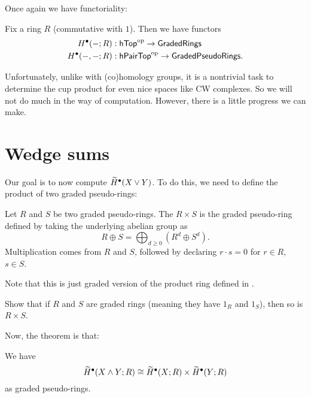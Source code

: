 Once again we have functoriality:
\begin{theorem}
	Fix a ring $R$ (commutative with $1$).
	Then we have functors
	\begin{align*}
		H^\bullet(-; R) &: \mathsf{hTop}^{\mathrm{op}} \to \mathsf{GradedRings} \\
		H^\bullet(-,-; R) &: \mathsf{hPairTop}^{\mathrm{op}} \to \mathsf{GradedPseudoRings}.
	\end{align*}
\end{theorem}

Unfortunately, unlike with (co)homology groups,
it is a nontrivial task to determine the cup product
for even nice spaces like CW complexes.
So we will not do much in the way of computation.
However, there is a little progress we can make.

\section{Wedge sums}
Our goal is to now compute $\widetilde H^\bullet(X \vee Y)$.
To do this, we need to define the product of two graded pseudo-rings:
\begin{definition}
	Let $R$ and $S$ be two graded pseudo-rings.
	The  $R \times S$ is the graded pseudo-ring
	defined by taking the underlying abelian group as 
	\[ R \oplus S = \bigoplus_{d \ge 0} (R^d \oplus S^d). \]
	Multiplication comes from $R$ and $S$, followed by
	declaring $r \cdot s = 0$ for $r \in R$, $s \in S$.
\end{definition}
Note that this is just graded version of the product ring
defined in .
\begin{exercise}
	Show that if $R$ and $S$ are graded rings (meaning they have $1_R$ and $1_S$),
	then so is $R \times S$.
\end{exercise}

Now, the theorem is that:
\begin{theorem}
	We have
	\[
		\widetilde H^\bullet(X \wedge Y; R)
		\cong \widetilde H^\bullet(X;R)
		\times \widetilde H^\bullet(Y;R)
	\]
	as graded pseudo-rings.
\end{theorem}

